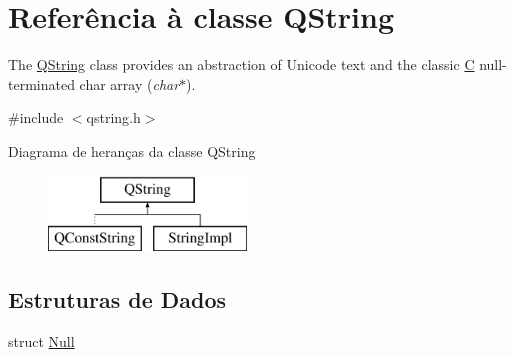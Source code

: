 \hypertarget{class_q_string}{\section{Referência à classe Q\-String}
\label{class_q_string}
}


The \hyperlink{class_q_string}{Q\-String} class provides an abstraction of Unicode text and the classic \hyperlink{class_c}{C} null-\/terminated char array ({\itshape char$\ast$}).  




{\ttfamily \#include $<$qstring.\-h$>$}

Diagrama de heranças da classe Q\-String\begin{figure}[H]
\begin{center}
\leavevmode
\includegraphics[height=2.000000cm]{class_q_string}
\end{center}
\end{figure}
\subsection*{Estruturas de Dados}
\begin{DoxyCompactItemize}
\item 
struct \hyperlink{struct_q_string_1_1_null}{Null}
\end{DoxyCompactItemize}

